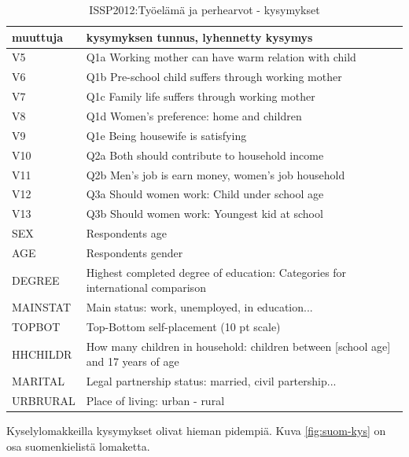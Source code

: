 \documentclass[
  finnish,
]{book}
\begin{document}
\begin{table}

\caption{\label{tab:vartable1}ISSP2012:Työelämä ja perhearvot - kysymykset}
\centering
\begin{tabular}[t]{ll}
\toprule
muuttuja & kysymyksen tunnus, lyhennetty kysymys\\
\midrule
V5 & Q1a Working mother can have warm relation with child\\
V6 & Q1b Pre-school child suffers through working mother\\
V7 & Q1c Family life suffers through working mother\\
V8 & Q1d Women’s preference: home and children\\
V9 & Q1e Being housewife is satisfying\\
\addlinespace
V10 & Q2a Both should contribute to household income\\
V11 & Q2b Men’s job is earn money, women’s job household\\
V12 & Q3a Should women work: Child under school age\\
V13 & Q3b Should women work: Youngest kid at school\\
SEX & Respondents age\\
\addlinespace
AGE & Respondents gender\\
DEGREE & Highest completed degree of education: Categories for international comparison\\
MAINSTAT & Main status: work, unemployed, in education...\\
TOPBOT & Top-Bottom self-placement (10 pt scale)\\
HHCHILDR & How many children in household: children between [school age] and 17 years of age\\
\addlinespace
MARITAL & Legal partnership status: married, civil partership...\\
URBRURAL & Place of living: urban - rural\\
\bottomrule
\end{tabular}
\end{table}

Kyselylomakkeilla kysymykset olivat hieman pidempiä. Kuva \ref{fig:suom-kys}
on osa suomenkielistä lomaketta.
\end{document}
